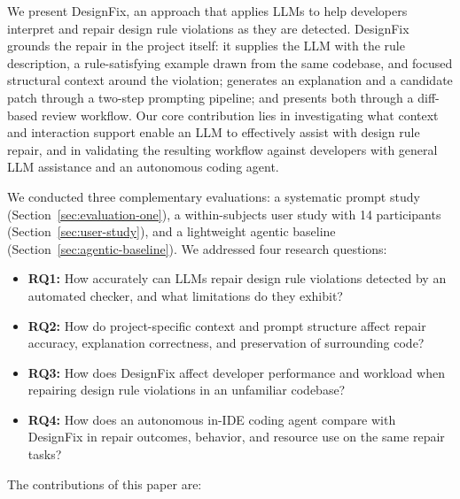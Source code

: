 We present DesignFix, an approach that applies LLMs to
help developers interpret and repair design rule violations as they
are detected. DesignFix
grounds the repair in the project itself: it supplies the LLM with the
rule description, a rule-satisfying example drawn from the same
codebase, and focused structural context around the violation;
generates an explanation and a candidate patch through a two-step
prompting pipeline; and presents both through a diff-based review
workflow. Our core contribution lies in investigating
what context and interaction support enable an LLM to effectively
assist with design rule repair, and in validating the resulting
workflow against developers with general LLM assistance and an autonomous coding agent.

We conducted three complementary evaluations: a systematic prompt study
(Section~\ref{sec:evaluation-one}), a within-subjects user study with
14 participants (Section~\ref{sec:user-study}), and a lightweight
agentic baseline (Section~\ref{sec:agentic-baseline}). We addressed
four research questions:

\begin{itemize}
\item \textbf{RQ1:} How accurately can LLMs repair design rule
violations detected by an automated checker, and what limitations do
they exhibit?

\item \textbf{RQ2:} How do project-specific context and prompt
structure affect repair accuracy, explanation correctness, and
preservation of surrounding code?

\item \textbf{RQ3:} How does DesignFix affect developer performance and
workload when repairing design rule violations in an unfamiliar
codebase?

\item \textbf{RQ4:} How does an autonomous in-IDE coding agent compare
with DesignFix in repair outcomes, behavior, and resource use on the
same repair tasks?
\end{itemize}

The contributions of this paper are:

